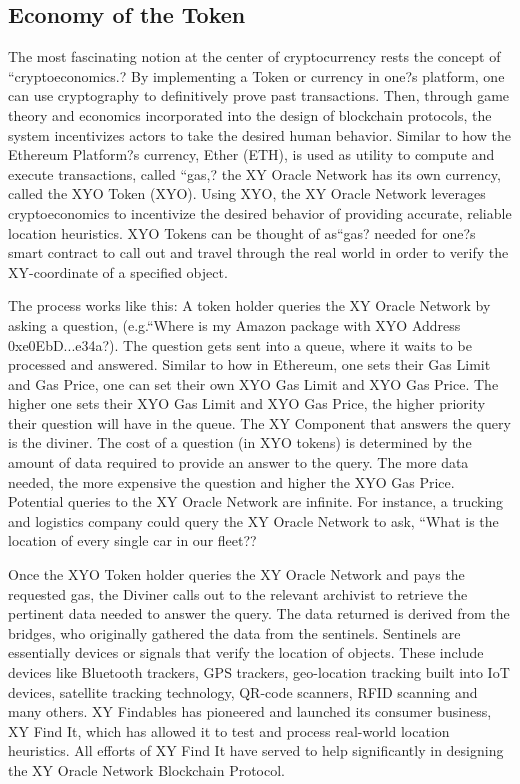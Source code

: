 \documentclass{article}
\begin{document}
\subsection {Economy of the Token}
The most fascinating notion at the center of cryptocurrency rests the concept of ``\gls{cryptoeconomics}.? By implementing a Token or currency in one?s platform, one can use cryptography to definitively prove past transactions. Then, through game theory and economics incorporated into the design of blockchain protocols, the system incentivizes actors to take the desired human behavior. Similar to how the Ethereum Platform?s currency, Ether (ETH), is used as utility to compute and execute transactions, called ``\gls{gas},? the XY Oracle Network has its own currency, called the XYO Token (XYO). Using XYO, the XY Oracle Network leverages cryptoeconomics to incentivize the desired behavior of providing accurate, reliable location \glspl{heuristic}. XYO Tokens can be thought of as``gas? needed for one?s smart contract to call out and travel through the real world in order to verify the XY-coordinate of a specified object.

The process works like this: A token holder queries the XY Oracle Network by asking a question, (e.g.``Where is my Amazon package with XYO Address 0xe0EbD...e34a?). The question gets sent into a queue, where it waits to be processed and answered. Similar to how in Ethereum, one sets their Gas Limit and Gas Price, one can set their own XYO Gas Limit and XYO Gas Price. The higher one sets their XYO Gas Limit and XYO Gas Price, the higher priority their question will have in the queue. The XY Component that answers the query is the \Gls{diviner}. The cost of a question (in XYO tokens) is determined by the amount of data required to provide an answer to the query.  The more data needed, the more expensive the question and higher the XYO Gas Price. Potential queries to the XY Oracle Network are infinite. For instance, a trucking and logistics company could query the XY Oracle Network to ask, ``What is the location of every single car in our fleet??

Once the XYO Token holder queries the XY Oracle Network and pays the requested gas, the Diviner calls out to the relevant \Gls{archivist} to retrieve the pertinent data needed to answer the query. The data returned is derived from the \Glspl{bridge}, who originally gathered the data from the \Glspl{sentinel}. Sentinels are essentially devices or signals that verify the location of objects. These include devices like Bluetooth trackers, GPS trackers, geo-location tracking built into IoT devices, satellite tracking technology, QR-code scanners, RFID scanning and many others. XY Findables has pioneered and launched its consumer business, XY Find It, which has allowed it to test and process real-world location heuristics. All efforts of XY Find It have served to help significantly in designing the XY Oracle Network Blockchain Protocol.
\end{document}
